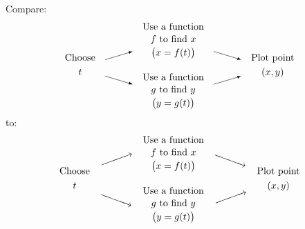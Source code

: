 \documentclass[10pt]{book}
\begin{document}
Compare: %
\[
\begin{gathered}\text{Choose}\\t\end{gathered}\quad
\tikz[>=latex,baseline=(current bounding box.center)]{\draw[->](0,.3)--(1,.6);\draw[->](0,-.3)--(1,-.6);}\quad
{\addtolength{\jot}{-.5ex}
\begin{gathered}
\text{Use a function}\\f\text{ to find }x\\\bigl(x=f(t)\bigr)\\\mbox{}\\
\text{Use a function}\\g\text{ to find }y\\\bigl(y=g(t)\bigr)
\end{gathered}
}\quad
\tikz[>=latex,baseline=(current bounding box.center)]{\draw[->](0,.6)--(1,.3);\draw[->](0,-.6)--(1,-.3);}\quad
\begin{gathered}\text{Plot point}\\(x,y)\end{gathered}
\]
to:
\[
\begin{gathered}\text{Choose}\\t\end{gathered}\quad
\begin{gathered}
\rotatebox{20}{$\xrightarrow{\hspace{1cm}}$}\\\\
\rotatebox{-20}{$\xrightarrow{\hspace{1cm}}$}
\end{gathered}\quad
{\addtolength{\jot}{-.5ex}
\begin{gathered}
\text{Use a function}\\f\text{ to find }x\\\bigl(x=f(t)\bigr)\\\\
\text{Use a function}\\g\text{ to find }y\\\bigl(y=g(t)\bigr)
\end{gathered}
}\quad
\begin{gathered}
\rotatebox{-20}{$\xrightarrow{\hspace{1cm}}$}\\\\
\rotatebox{20}{$\xrightarrow{\hspace{1cm}}$}
\end{gathered}\quad
\begin{gathered}\text{Plot point}\\(x,y)\end{gathered}
\]
\end{document}
